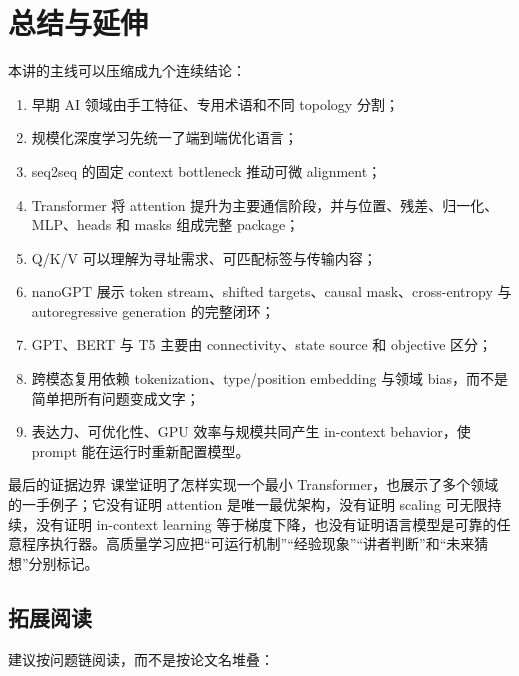 \section{总结与延伸}

本讲的主线可以压缩成九个连续结论：

\begin{enumerate}
  \item 早期 AI 领域由手工特征、专用术语和不同 topology 分割；
  \item 规模化深度学习先统一了端到端优化语言；
  \item seq2seq 的固定 context bottleneck 推动可微 alignment；
  \item Transformer 将 attention 提升为主要通信阶段，并与位置、残差、归一化、MLP、heads 和 masks 组成完整 package；
  \item Q/K/V 可以理解为寻址需求、可匹配标签与传输内容；
  \item nanoGPT 展示 token stream、shifted targets、causal mask、cross-entropy 与 autoregressive generation 的完整闭环；
  \item GPT、BERT 与 T5 主要由 connectivity、state source 和 objective 区分；
  \item 跨模态复用依赖 tokenization、type/position embedding 与领域 bias，而不是简单把所有问题变成文字；
  \item 表达力、可优化性、GPU 效率与规模共同产生 in-context behavior，使 prompt 能在运行时重新配置模型。
\end{enumerate}

\begin{warningbox}{最后的证据边界}
课堂证明了怎样实现一个最小 Transformer，也展示了多个领域的一手例子；它没有证明 attention 是唯一最优架构，没有证明 scaling 可无限持续，没有证明 in-context learning 等于梯度下降，也没有证明语言模型是可靠的任意程序执行器。高质量学习应把“可运行机制”“经验现象”“讲者判断”和“未来猜想”分别标记。
\end{warningbox}

\subsection{拓展阅读}

建议按问题链阅读，而不是按论文名堆叠：

